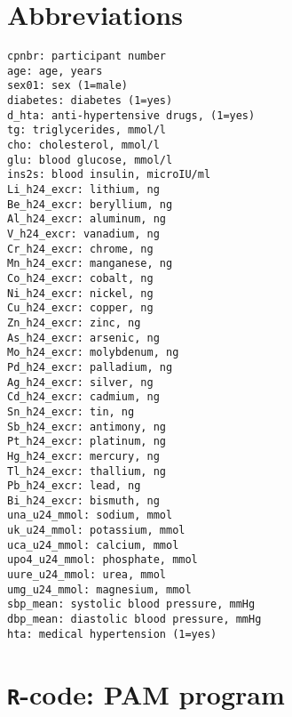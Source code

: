 \documentclass[a4paper]{book}
\begin{document}
\chapter*{Abbreviations}

\begin{verbatim}
cpnbr: participant number
age: age, years
sex01: sex (1=male)
diabetes: diabetes (1=yes)
d_hta: anti-hypertensive drugs, (1=yes)
tg: triglycerides, mmol/l
cho: cholesterol, mmol/l
glu: blood glucose, mmol/l
ins2s: blood insulin, microIU/ml
Li_h24_excr: lithium, ng
Be_h24_excr: beryllium, ng
Al_h24_excr: aluminum, ng
V_h24_excr: vanadium, ng
Cr_h24_excr: chrome, ng
Mn_h24_excr: manganese, ng
Co_h24_excr: cobalt, ng
Ni_h24_excr: nickel, ng
Cu_h24_excr: copper, ng
Zn_h24_excr: zinc, ng
As_h24_excr: arsenic, ng
Mo_h24_excr: molybdenum, ng
Pd_h24_excr: palladium, ng
Ag_h24_excr: silver, ng
Cd_h24_excr: cadmium, ng
Sn_h24_excr: tin, ng
Sb_h24_excr: antimony, ng
Pt_h24_excr: platinum, ng
Hg_h24_excr: mercury, ng
Tl_h24_excr: thallium, ng
Pb_h24_excr: lead, ng
Bi_h24_excr: bismuth, ng
una_u24_mmol: sodium, mmol
uk_u24_mmol: potassium, mmol
uca_u24_mmol: calcium, mmol
upo4_u24_mmol: phosphate, mmol
uure_u24_mmol: urea, mmol
umg_u24_mmol: magnesium, mmol
sbp_mean: systolic blood pressure, mmHg
dbp_mean: diastolic blood pressure, mmHg
hta: medical hypertension (1=yes)
\end{verbatim}


\chapter*{\texttt{R}-code: PAM program}
\end{document}
